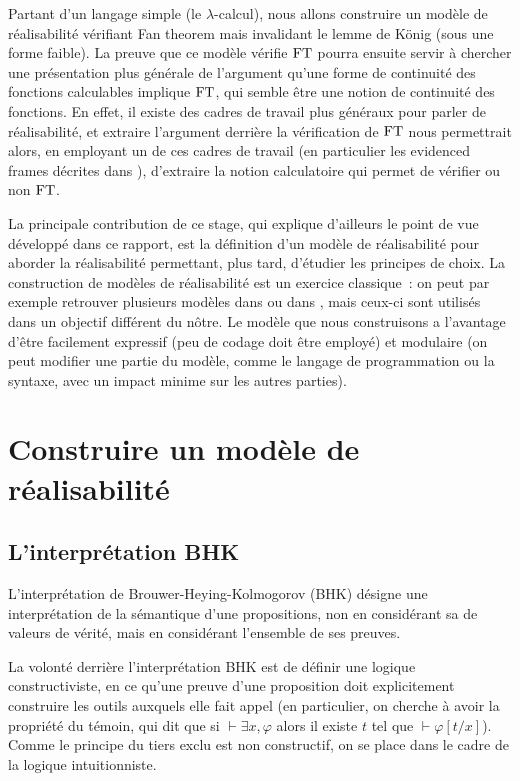 \documentclass{article}
\begin{document}
Partant d'un langage simple (le $\lambda$-calcul), nous allons construire un modèle de réalisabilité vérifiant Fan theorem mais invalidant le lemme de König (sous une forme faible). La preuve que ce modèle vérifie $\mathrm{FT}$ pourra ensuite servir à chercher une présentation plus générale de l'argument qu'une forme de continuité des fonctions calculables implique $\mathrm{FT}$, qui semble être une notion de continuité des fonctions. En effet, il existe des cadres de travail plus généraux pour parler de réalisabilité, et extraire l'argument derrière la vérification de $\mathrm{FT}$ nous permettrait alors, en employant un de ces cadres de travail (en particulier les evidenced frames décrites dans \cite{DBLP:conf/lics/0001MT21}), d'extraire la notion calculatoire qui permet de vérifier ou non $\mathrm{FT}$.

La principale contribution de ce stage, qui explique d'ailleurs le point de vue développé dans ce rapport, est la définition d'un modèle de réalisabilité pour aborder la réalisabilité permettant, plus tard, d'étudier les principes de choix. La construction de modèles de réalisabilité est un exercice classique~: on peut par exemple retrouver plusieurs modèles dans \cite{Dinis_2023} ou dans \cite{COHEN201987}, mais ceux-ci sont utilisés dans un objectif différent du nôtre. Le modèle que nous construisons a l'avantage d'être facilement expressif (peu de codage doit être employé) et modulaire (on peut modifier une partie du modèle, comme le langage de programmation ou la syntaxe, avec un impact minime sur les autres parties).

\section{Construire un modèle de réalisabilité}

\subsection{L'interprétation BHK}

L'interprétation de Brouwer-Heying-Kolmogorov (BHK) désigne une interprétation de la sémantique d'une propositions, non en considérant sa de valeurs de vérité, mais en considérant l'ensemble de ses preuves.

La volonté derrière l'interprétation BHK est de définir une logique constructiviste, en ce qu'une preuve d'une proposition doit explicitement construire les outils auxquels elle fait appel (en particulier, on cherche à avoir la propriété du témoin, qui dit que si $\vdash \exists x, \varphi$ alors il existe $t$ tel que $\vdash \varphi[t/x]$). Comme le principe du tiers exclu est non constructif, on se place dans le cadre de la logique intuitionniste.
\end{document}
